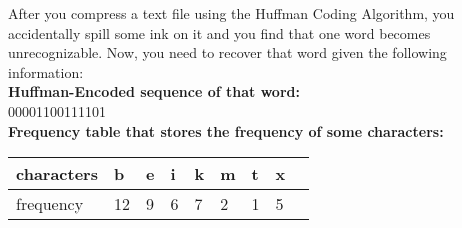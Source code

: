 
After you compress a text file using the Huffman Coding Algorithm, you accidentally spill some ink on it and you find that one word becomes unrecognizable. Now, you need to recover that word given the following information:\\

    \textbf{Huffman-Encoded sequence of that word: } \\
    00001100111101\\
    \textbf{Frequency table that stores the frequency of some characters: }\\
    \begin{table}[!hbtp]
    \centering
    \begin{tabular}{|l|l|l|l|l|l|l|l|l|}
    \hline
    characters & b & e & i & k & m & t & x \\ \hline
    frequency  & 12 & 9 & 6 & 7 & 2 & 1 & 5 \\ \hline
    \end{tabular}
    \end{table}\\\\
